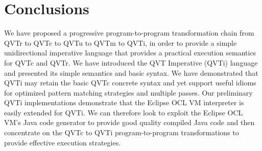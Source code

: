 %
\section{Conclusions}\label{sec:concandfuture}

We have proposed a progressive program-to-program transformation chain from QVTr to QVTc to QVTu to QVTm to QVTi, in order to provide a simple unidirectional imperative language that provides a practical execution semantics for QVTc and QVTr. We have introduced the QVT Imperative (QVTi) language and presented its simple semantics and basic syntax. We have demonstrated that QVTi may retain the basic QVTc concrete syntax and yet support useful idioms for optimized pattern matching strategies and multiple passes. Our preliminary QVTi implementations demonstrate that the Eclipse OCL VM interpreter is easily extended for QVTi. We can therefore look to exploit the Eclipse OCL VM's Java code generator to provide good quality compiled Java code and then concentrate on the QVTc to QVTi program-to-program transformations to provide effective execution strategies.

